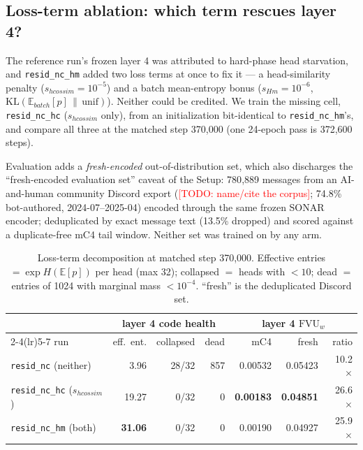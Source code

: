\documentclass[11pt]{article}
\newcommand{\todo}[1]{\textcolor{red}{[TODO: #1]}}
\newcommand{\fvu}{\mathrm{FVU}_w}
\begin{document}
\subsection{Loss-term ablation: which term rescues layer 4?}

The reference run's frozen layer 4 was attributed to hard-phase head
starvation, and \texttt{resid\_nc\_hm} added two loss terms at once to fix
it --- a head-similarity penalty ($s_{hcossim}{=}10^{-5}$) and a batch
mean-entropy bonus ($s_{Hm}{=}10^{-6}$, $\mathrm{KL}(\mathbb{E}_{batch}[p]
\,\|\,\mathrm{unif})$). Neither could be credited. We train the missing
cell, \texttt{resid\_nc\_hc} ($s_{hcossim}$ only), from an initialization
bit-identical to \texttt{resid\_nc\_hm}'s, and compare all three at the
matched step 370{,}000 (one 24-epoch pass is 372{,}600 steps).

Evaluation adds a \emph{fresh-encoded} out-of-distribution set, which also
discharges the ``fresh-encoded evaluation set'' caveat of the Setup:
780{,}889 messages from an AI-and-human community Discord export
(\todo{name/cite the corpus}; 74.8\% bot-authored,
2024-07--2025-04) encoded through the same frozen SONAR encoder;
deduplicated by exact message text (13.5\% dropped) and scored against a
duplicate-free mC4 tail window. Neither set was trained on by any arm.

\begin{table}[h]\centering\small
\begin{tabular}{@{}lrrrrrr@{}}
\toprule
 & \multicolumn{3}{c}{layer 4 code health} & \multicolumn{3}{c}{layer 4 $\fvu$} \\
\cmidrule(lr){2-4}\cmidrule(lr){5-7}
run & eff.\ ent. & collapsed & dead & mC4 & fresh & ratio \\
\midrule
\texttt{resid\_nc} (neither)      & 3.96  & 28/32 & 857 & 0.00532 & 0.05423 & 10.2$\times$ \\
\texttt{resid\_nc\_hc} ($s_{hcossim}$) & 19.27 & 0/32 & 0 & \textbf{0.00183} & \textbf{0.04851} & 26.6$\times$ \\
\texttt{resid\_nc\_hm} (both)     & \textbf{31.06} & 0/32 & 0 & 0.00190 & 0.04927 & 25.9$\times$ \\
\bottomrule
\end{tabular}
\caption{Loss-term decomposition at matched step 370{,}000. Effective
entries $=\exp H(\mathbb{E}[p])$ per head (max 32); collapsed $=$ heads
with $<10$; dead $=$ entries of 1024 with marginal mass $<10^{-4}$.
``fresh'' is the deduplicated Discord set.}
\end{table}
\end{document}
